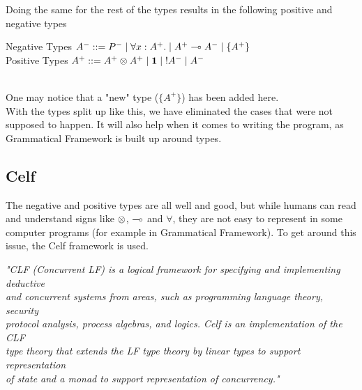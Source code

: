 Doing the same for the rest of the types results in the following positive and negative types
\begin{texto}
Negative Types $A^- ::= P^- \; | \; \forall x:A^+. \; | \; A^+ \multimap A^- \; | \; \{ A^+ \} $\\
Positive Types \hspace{0.8pt} $A^+ ::= A^+ \otimes A^+ \; | \; \mathord{\text{\rm\bf 1}} \; | \; \mathord{\text{\rm !}} A^- \; | \; A^- $
\end{texto}
 \\
One may notice that a "new" type ($\{ A^+ \}$) has been added here.\\
With the types split up like this, we have eliminated the cases that were not supposed to happen. It will also help when it comes to writing the program, as Grammatical Framework is built up around types.

\subsection{Celf}
\label{LL_03}

The negative and positive types are all well and good, but while humans can read and understand signs like $\otimes$, $\multimap$ and $\forall$, they are not easy to represent in some computer programs (for example in Grammatical Framework). To get around this issue, the Celf framework is used.

\begin{texto}
\textit{"CLF (Concurrent LF) is a logical framework for specifying and implementing deductive \\
and concurrent systems from areas, such as programming language theory, security \\
protocol analysis, process algebras, and logics. Celf is an implementation of the CLF \\
type theory that extends the LF type theory by linear types to support representation \\
of state and a monad to support representation of concurrency."} \cite{Celf}
\end{texto}

